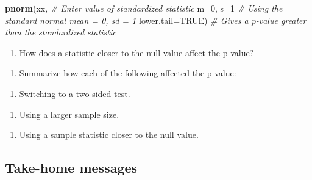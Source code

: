 \documentclass[
]{report}
\newenvironment{Shaded}{\begin{snugshade}}{\end{snugshade}}
\newcommand{\AttributeTok}[1]{\textcolor[rgb]{0.13,0.29,0.53}{#1}}
\newcommand{\CommentTok}[1]{\textcolor[rgb]{0.56,0.35,0.01}{\textit{#1}}}
\newcommand{\ConstantTok}[1]{\textcolor[rgb]{0.56,0.35,0.01}{#1}}
\newcommand{\DecValTok}[1]{\textcolor[rgb]{0.00,0.00,0.81}{#1}}
\newcommand{\FunctionTok}[1]{\textcolor[rgb]{0.13,0.29,0.53}{\textbf{#1}}}
\newcommand{\NormalTok}[1]{#1}
\providecommand{\tightlist}{%
  \setlength{\itemsep}{0pt}\setlength{\parskip}{0pt}}
\begin{document}
\begin{Shaded}
\begin{Highlighting}[]
\FunctionTok{pnorm}\NormalTok{(xx, }\CommentTok{\# Enter value of standardized statistic}
      \AttributeTok{m=}\DecValTok{0}\NormalTok{, }\AttributeTok{s=}\DecValTok{1} \CommentTok{\# Using the standard normal mean = 0, sd = 1}
      \AttributeTok{lower.tail=}\ConstantTok{TRUE}\NormalTok{) }\CommentTok{\# Gives a p{-}value greater than the standardized statistic}
\end{Highlighting}
\end{Shaded}

\begin{enumerate}
\def\labelenumi{\arabic{enumi}.}
\setcounter{enumi}{17}
\tightlist
\item
  How does a statistic closer to the null value affect the p-value?
\end{enumerate}

\vspace{0.3in}

\begin{enumerate}
\def\labelenumi{\arabic{enumi}.}
\setcounter{enumi}{18}
\tightlist
\item
  Summarize how each of the following affected the p-value:
\end{enumerate}

\begin{enumerate}
\def\labelenumi{\alph{enumi})}
\tightlist
\item
  Switching to a two-sided test.
\end{enumerate}

\vspace{0.4in}

\begin{enumerate}
\def\labelenumi{\alph{enumi})}
\setcounter{enumi}{1}
\tightlist
\item
  Using a larger sample size.
\end{enumerate}

\vspace{0.4in}

\begin{enumerate}
\def\labelenumi{\alph{enumi})}
\setcounter{enumi}{2}
\tightlist
\item
  Using a sample statistic closer to the null value.
\end{enumerate}

\vspace{0.4in}
\newpage

\hypertarget{take-home-messages-15}{%
\subsection{Take-home messages}\label{take-home-messages-15}}
\end{document}
